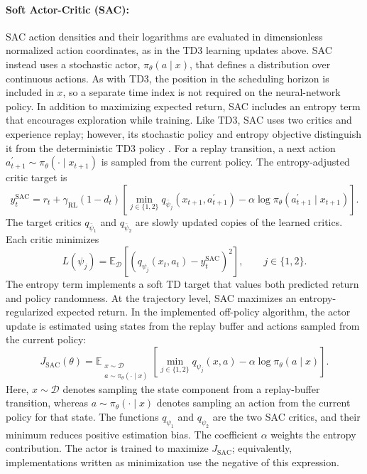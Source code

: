 \documentclass[12pt]{article}
\begin{document}
\paragraph{Soft Actor-Critic (SAC):}
SAC action densities and their logarithms are evaluated in dimensionless
normalized action coordinates, as in the TD3 learning updates above.
SAC instead uses a stochastic actor, $\pi_\theta(a\mid x)$, that defines a distribution over continuous actions. As with TD3, the position in the scheduling horizon is included in $x$, so a separate time index is not required on the neural-network policy. In addition to maximizing expected return, SAC includes an entropy term that encourages exploration while training. Like TD3, SAC uses two critics and experience replay; however, its stochastic policy and entropy objective distinguish it from the deterministic TD3 policy \cite{haarnoja2018soft}. For a replay transition, a next action $a_{t+1}^{\prime}\sim\pi_\theta(\cdot\mid x_{t+1})$ is sampled from the current policy. The entropy-adjusted critic target is
\[
y_t^{\mathrm{SAC}}=r_t+\gamma_{\mathrm{RL}}(1-d_t)\left[
\min_{j\in\{1,2\}}q_{\bar\psi_j}(x_{t+1},a_{t+1}^{\prime})
-\alpha\log\pi_\theta(a_{t+1}^{\prime}\mid x_{t+1})
\right].
\]
The target critics $q_{\bar\psi_1}$ and $q_{\bar\psi_2}$ are slowly updated copies of the learned critics. Each critic minimizes
\[
L(\psi_j)=\mathbb{E}_{\mathcal{D}}\!\left[
\left(q_{\psi_j}(x_t,a_t)-y_t^{\mathrm{SAC}}\right)^2
\right],\qquad j\in\{1,2\}.
\]
The entropy term implements a soft TD target that values both predicted return and policy randomness. At the trajectory level, SAC maximizes an entropy-regularized expected return. In the implemented off-policy algorithm, the actor update is estimated using states from the replay buffer and actions sampled from the current policy:
\[
J_{\mathrm{SAC}}(\theta)
=
\mathbb{E}_{\substack{x\sim\mathcal{D}\\
a\sim\pi_\theta(\cdot\mid x)}}\!\left[
\min_{j\in\{1,2\}}q_{\psi_j}(x,a)
-\alpha\log\pi_\theta(a\mid x)
\right].
\]
Here, $x\sim\mathcal{D}$ denotes sampling the state component from a replay-buffer transition, whereas $a\sim\pi_\theta(\cdot\mid x)$ denotes sampling an action from the current policy for that state. The functions $q_{\psi_1}$ and $q_{\psi_2}$ are the two SAC critics, and their minimum reduces positive estimation bias. The coefficient $\alpha$ weights the entropy contribution. The actor is trained to maximize $J_{\mathrm{SAC}}$; equivalently, implementations written as minimization use the negative of this expression.
\end{document}

